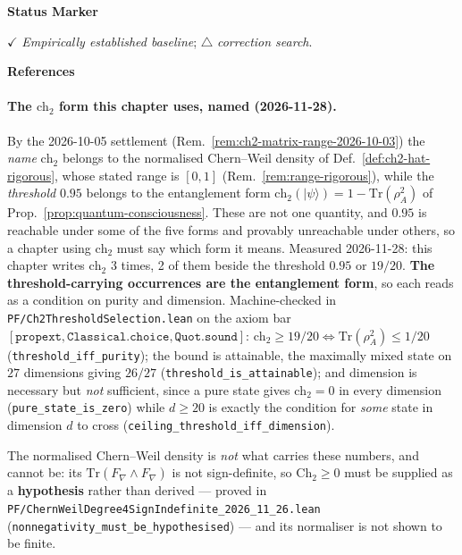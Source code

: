 \textbf{Status Marker}

$\checkmark$ \textit{Empirically established baseline}; $\triangle$ \textit{correction search}.

\textbf{References}

\cite{casimir1948attraction,lamoreaux1997demonstration,bressi2002measurement}

\paragraph{The $\text{ch}_2$ form this chapter uses, named (2026-11-28).}
By the 2026-10-05 settlement (Rem.~\ref{rem:ch2-matrix-range-2026-10-03}) the
\emph{name} $\text{ch}_2$ belongs to the normalised Chern--Weil density of
Def.~\ref{def:ch2-hat-rigorous}, whose stated range is $[0,1]$
(Rem.~\ref{rem:range-rigorous}), while the \emph{threshold} $0.95$ belongs to the
entanglement form $\text{ch}_2(|\psi\rangle) = 1 - \mathrm{Tr}(\rho_A^2)$ of
Prop.~\ref{prop:quantum-consciousness}. These are not one quantity, and $0.95$ is
reachable under some of the five forms and provably unreachable under others, so a
chapter using $\text{ch}_2$ must say which form it means.
Measured 2026-11-28: this chapter writes $\text{ch}_2$ 3 times, 2 of them
beside the threshold $0.95$ or $19/20$. \textbf{The threshold-carrying occurrences
are the entanglement form}, so each reads as a condition on purity and dimension.
Machine-checked in \texttt{PF/Ch2ThresholdSelection.lean} on the axiom bar
$[\mathtt{propext}, \mathtt{Classical.choice}, \mathtt{Quot.sound}]$:
$\text{ch}_2 \geq 19/20 \iff \mathrm{Tr}(\rho_A^2) \leq 1/20$
(\texttt{threshold\_iff\_purity}); the bound is attainable, the maximally mixed
state on $27$ dimensions giving $26/27$ (\texttt{threshold\_is\_attainable}); and
dimension is necessary but \emph{not} sufficient, since a pure state gives
$\text{ch}_2 = 0$ in every dimension (\texttt{pure\_state\_is\_zero}) while
$d \geq 20$ is exactly the condition for \emph{some} state in dimension $d$ to
cross (\texttt{ceiling\_threshold\_iff\_dimension}).

\noindent The normalised Chern--Weil density is \emph{not} what carries these
numbers, and cannot be: its $\mathrm{Tr}(F_\nabla \wedge F_\nabla)$ is not
sign-definite, so $\mathrm{Ch}_2 \geq 0$ must be supplied as a \textbf{hypothesis}
rather than derived --- proved in
\texttt{PF/ChernWeilDegree4SignIndefinite\_2026\_11\_26.lean}
(\texttt{nonnegativity\_must\_be\_hypothesised}) --- and its normaliser is not
shown to be finite.


